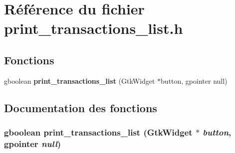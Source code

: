 \section{Référence du fichier print\_\-transactions\_\-list.h}
\label{print__transactions__list_8h}
\subsection*{Fonctions}
\begin{DoxyCompactItemize}
\item 
gboolean {\bf print\_\-transactions\_\-list} (GtkWidget $\ast$button, gpointer null)
\end{DoxyCompactItemize}


\subsection{Documentation des fonctions}
\subsubsection[{print\_\-transactions\_\-list}]{\setlength{\rightskip}{0pt plus 5cm}gboolean print\_\-transactions\_\-list (GtkWidget $\ast$ {\em button}, \/  gpointer {\em null})}\label{print__transactions__list_8h_a96e50745e721d5b62101639beb10b6e1}

